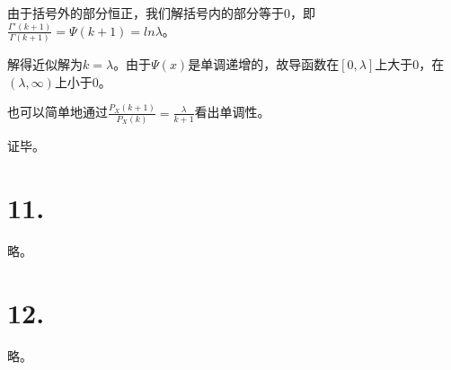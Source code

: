 \documentclass[UTF8]{report}
\begin{document}
        由于括号外的部分恒正，我们解括号内的部分等于0，即$\frac{\Gamma'(k + 1)}{\Gamma(k + 1)} = \Psi(k + 1) = ln\lambda$。

        解得近似解为$k = \lambda$。由于$\Psi(x)$是单调递增的，故导函数在$[0, \lambda]$上大于0，在$(\lambda, \infty)$上小于0。

        也可以简单地通过$\frac{P_X(k + 1)}{P_X(k)} = \frac{\lambda}{k + 1}$看出单调性。

        证毕。
    \section*{11.}
        略。
    \section*{12.}
        略。
\end{document}
